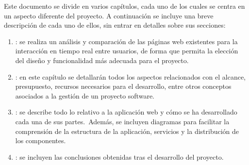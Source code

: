 
Este documento se divide en varios capítulos, cada uno de los cuales se centra en un aspecto diferente del proyecto.
A continuación se incluye una breve descripción de cada uno de ellos, sin entrar en detalles sobre sus secciones:

\begin{enumerate}
	\item {}: se realiza un análisis y comparación de las páginas web existentes para la
	interacción en tiempo real entre usuarios, de forma que permita la elección del diseño y funcionalidad más
	adecuada para el proyecto.
	\item {}: en este capítulo se detallarán todos los aspectos relacionados con
	el alcance, presupuesto, recursos necesarios para el desarrollo, entre otros conceptos asociados a la gestión de un
	proyecto software.
	\item {}: se describe todo lo relativo a la aplicación web y cómo se ha desarrollado cada
	una de sus partes.\ Además, se incluyen diagramas para facilitar la comprensión de la estructura de la aplicación,
	servicios y la distribución de los componentes.
	\item {}: se incluyen las conclusiones obtenidas tras el desarrollo del proyecto.
\end{enumerate}
